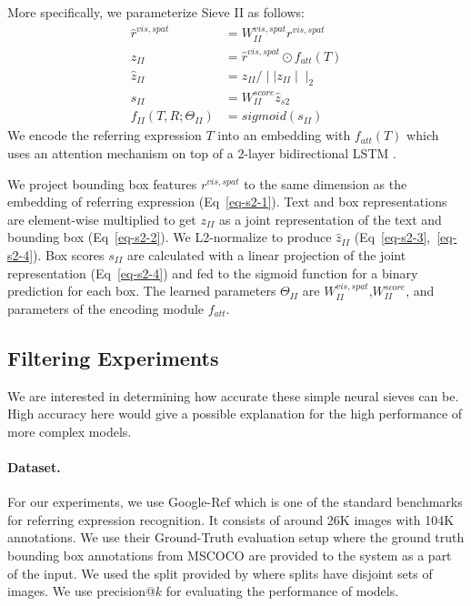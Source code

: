 \documentclass[11pt,a4paper]{article}
\begin{document}
More specifically, we parameterize Sieve II as follows:
\vspace{-10pt}
\begin{align}
	\hat{r}^{vis,spat} & = W^{vis,spat}_{II} r^{vis,spat} \label{eq-s2-1} \\ 
	z_{II} & = \hat{r}^{vis,spat} \odot f_{att}(T) \label{eq-s2-2} \\
    \hat{z}_{II} & =  z_{II} / \mid\mid z_{II} \mid\mid_{2} \label{eq-s2-3} \\ 
    s_{II} & =  W_{II}^{score} \hat{z}_{s2}  \label{eq-s2-4} \\
    f_{II}(T,R; \Theta_{II}) & =  sigmoid(s_{II}) \label{eq-s2-5}
\end{align}
We encode the referring expression $T$  into an embedding with $f_{att}(T)$ which uses an attention mechanism \cite{bahdanau2014neural} on top of a 2-layer bidirectional LSTM \citep{schuster1997bidirectional}.

We project bounding box features $r^{vis,spat}$ to the same dimension as the embedding of referring expression (Eq~\ref{eq-s2-1}).
Text and box representations are element-wise multiplied to get $z_{II}$ as a joint representation of the text and bounding box (Eq~\ref{eq-s2-2}).
We L2-normalize to produce $\hat{z}_{II}$ (Eq~\ref{eq-s2-3},~\ref{eq-s2-4}).
Box scores $s_{II}$ are calculated with a linear projection of the joint representation (Eq~\ref{eq-s2-4}) and fed to the sigmoid function for a binary prediction for each box.
The learned parameters $\Theta_{II}$ are $W_{II}^{vis,spat}$,$W_{II}^{score}$, and parameters of the encoding module $f_{att}$.
%
\vspace{-5pt}
\subsection{Filtering Experiments}\label{sec:experiments}
\vspace{-5pt}
We are interested in determining how accurate these simple neural sieves can be. High accuracy here would give a possible explanation for the high performance of more complex models.
\tableeight
\paragraph{Dataset.} For our experiments, we use Google-Ref \citep{mao2016generation} which is one of the standard benchmarks for referring expression recognition. It consists of around 26K images with 104K annotations.
We use their Ground-Truth evaluation setup where the ground truth bounding box annotations from MSCOCO \citep{lin2014microsoft} are provided to the system as a part of the input.
We used the split provided by \citet{nagaraja16refexp} where splits have disjoint sets of images.
We use precision@$k$ for evaluating the performance of models.
\end{document}

